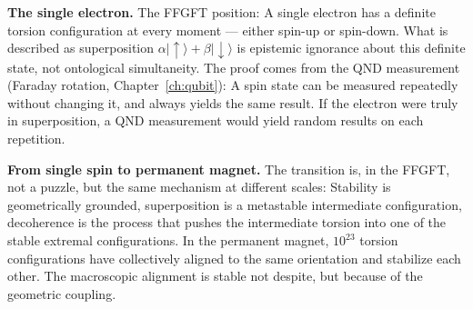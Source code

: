 \textbf{The single electron.} The FFGFT position: A single electron
has a definite torsion configuration at every moment --- either
spin-up or spin-down. What is described as superposition $\alpha|\uparrow\rangle+
\beta|\downarrow\rangle$ is epistemic ignorance about this definite state,
not ontological simultaneity. The
proof comes from the QND measurement (Faraday rotation, Chapter~\ref{ch:qubit}):
A spin state can be measured repeatedly without changing it,
and always yields the same result. If the electron were truly in
superposition, a QND measurement would yield random
results on each repetition.

\textbf{From single spin to permanent magnet.} The transition is, in the
FFGFT, not a puzzle, but the same mechanism at different scales:
Stability is geometrically grounded, superposition is a metastable
intermediate configuration, decoherence is the process that pushes the intermediate
torsion into one of the stable extremal configurations. In the
permanent magnet, $10^{23}$ torsion configurations have collectively
aligned to the same orientation and stabilize each other.
The macroscopic alignment is stable not despite, but because of the
geometric coupling.

